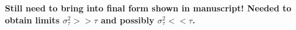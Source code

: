 \documentclass{article}
\begin{document}
\textbf{Still need to bring into final form shown in manuscript! Needed to obtain limits $\sigma^2_\tau >> \tau$ and possibly $\sigma^2_\tau << \tau$.}
%
\end{document}
